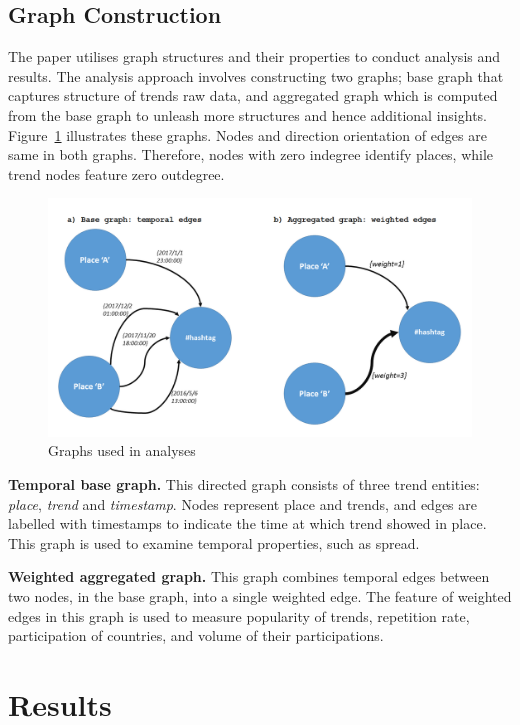 \documentclass{llncs}
\begin{document}
\subsection{Graph Construction}

The paper utilises graph structures and their properties to conduct
analysis and results. The analysis approach involves constructing two
graphs; base graph that captures structure of trends raw data, and
aggregated graph which is computed from the base graph to unleash more
structures and hence additional
insights. Figure~\ref{fig:graphexamples} illustrates these
graphs. Nodes and direction orientation of edges are same in both
graphs. Therefore, nodes with zero indegree identify places, while
trend nodes feature zero outdegree.

\begin{figure}[htb]
\centering
\includegraphics[width=\columnwidth]{images/graphexamples.png}
\caption{Graphs used in analyses}
\label{fig:graphexamples}
\end{figure}

{\textbf{Temporal base graph.}} This directed graph consists of three
trend entities: {\emph{place}}, {\emph{trend}} and
{\emph{timestamp}}. Nodes represent place and trends, and edges are
labelled with timestamps to indicate the time at which trend showed in
place. This graph is used to examine temporal properties, such as
spread.

{\textbf{Weighted aggregated graph.}} This graph combines temporal
edges between two nodes, in the base graph, into a single weighted
edge. The feature of weighted edges in this graph is used to measure
popularity of trends, repetition rate, participation of countries, and
volume of their participations.


\section{Results}\label{results}
\end{document}
